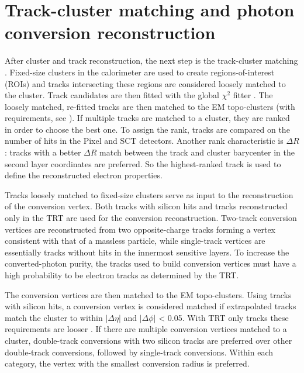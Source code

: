 \documentclass[a4paper, oneside]{book}
\begin{document}
		\section{Track-cluster matching and photon conversion reconstruction}\label{section:match}
			After cluster and track reconstruction, the next step is the track-cluster matching \cite{El ph reco}. Fixed-size clusters in the calorimeter are used to create regions-of-interest (ROIs) and tracks intersecting
			these regions are considered loosely matched to the cluster. Track candidates are then fitted with the global $\chi^2$ fitter \cite{Chiquadro}. The loosely matched, re-fitted tracks are then matched to the EM topo-clusters (with requirements, see \cite{El ph reco}).
			If multiple tracks are matched to a cluster, they are ranked in order to choose the best one. To assign the rank, tracks are compared on the number of hits in the Pixel and SCT detectors. Another rank characteristic is $\Delta R$: tracks with a better $\Delta R$ match between the track and cluster barycenter in the second layer coordinates are preferred. So the highest-ranked track is used to define the reconstructed electron properties.
			
			Tracks loosely matched to fixed-size clusters serve as input to the reconstruction of the conversion vertex. Both tracks with silicon hits and tracks reconstructed only in the TRT are used for the conversion reconstruction. Two-track conversion vertices are reconstructed from two opposite-charge tracks forming a vertex consistent with that of a massless particle, while single-track vertices are essentially tracks without hits in the innermost sensitive layers. To increase the converted-photon purity, the tracks used to build conversion vertices must have a high probability to be electron tracks as determined by the TRT. %
			
			The conversion vertices are then matched to the EM topo-clusters. Using tracks with silicon hits, a conversion vertex is considered matched if extrapolated tracks
			match the cluster to within $|\Delta \eta|$ and $|\Delta \phi|$ < 0.05. With TRT only tracks these requirements are looser \cite{TRT loose}. If there are multiple conversion vertices matched to a cluster, double-track conversions with two silicon tracks are preferred over other double-track conversions, followed by single-track conversions. Within each category, the vertex with the smallest conversion radius is preferred.
			
\end{document}
